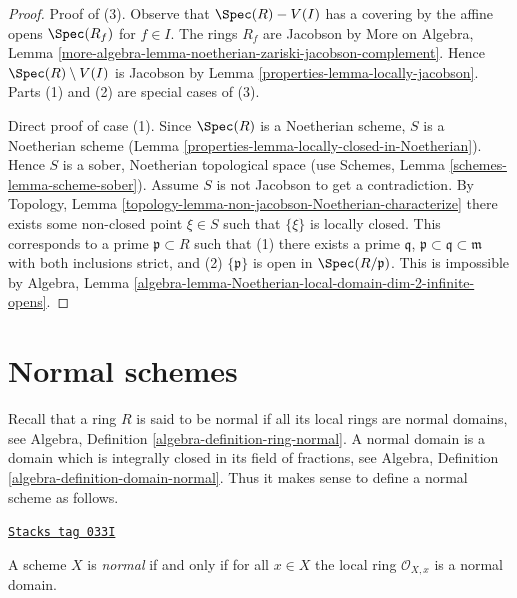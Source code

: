 \begin{proof}

Proof of (3). Observe that $\Spec(R) - V(I)$ has a covering by the affine
opens $\Spec(R_f)$ for $f \in I$. The rings $R_f$ are Jacobson by
More on Algebra, Lemma
\ref{more-algebra-lemma-noetherian-zariski-jacobson-complement}.
Hence $\Spec(R) \setminus V(I)$ is Jacobson by
Lemma \ref{properties-lemma-locally-jacobson}.
Parts (1) and (2) are special cases of (3).

\medskip\noindent
Direct proof of case (1).
Since $\Spec(R)$ is a Noetherian scheme,
$S$ is a Noetherian scheme (Lemma \ref{properties-lemma-locally-closed-in-Noetherian}).
Hence $S$ is a sober, Noetherian topological space (use
Schemes, Lemma \ref{schemes-lemma-scheme-sober}).
Assume $S$ is not Jacobson to
get a contradiction. By
Topology, Lemma \ref{topology-lemma-non-jacobson-Noetherian-characterize}
there exists some non-closed point $\xi \in S$
such that $\{\xi\}$ is locally closed. This corresponds
to a prime $\mathfrak p \subset R$ such that (1) there exists
a prime $\mathfrak q$, $\mathfrak p \subset \mathfrak q \subset \mathfrak m$
with both inclusions strict, and (2) $\{\mathfrak p\}$ is open in
$\Spec(R/\mathfrak p)$. This is impossible by Algebra,
Lemma \ref{algebra-lemma-Noetherian-local-domain-dim-2-infinite-opens}.
\end{proof}

\section{Normal schemes}
\label{properties-section-normal}
Recall that a ring $R$ is said to be normal if all its local rings
are normal domains,
see Algebra, Definition \ref{algebra-definition-ring-normal}.
A normal domain is a domain which is integrally closed in its field
of fractions, see
Algebra, Definition \ref{algebra-definition-domain-normal}.
Thus it makes sense to define a normal scheme as follows.

\begin{definition}[Normal]
\label{properties-definition-normal}
\href{https://stacks.math.columbia.edu/tag/033I}{\texttt{Stacks tag 033I}}

A scheme $X$ is {\it normal} if and only if for all $x \in X$ the local ring
$\mathcal{O}_{X, x}$ is a normal domain.
\end{definition}

